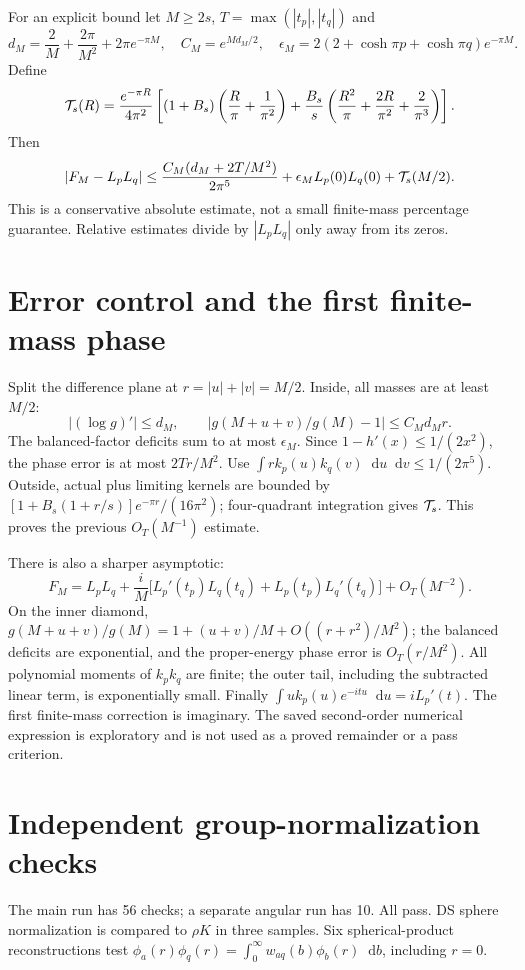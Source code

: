 \documentclass[11pt,a4paper]{article}
\newcommand{\dd}{\mathop{}\!\mathrm d}
\begin{document}
For an explicit bound let $M\ge2s$, $T=\max(|t_p|,|t_q|)$ and
\[
 d_M=\frac2M+\frac{2\pi}{M^2}+2\pi e^{-\pi M},\quad
 C_M=e^{Md_M/2},\quad
 \epsilon_M=2(2+\cosh\pi p+\cosh\pi q)e^{-\pi M}.
\]
Define
\begin{equation}
 {\cal T}_s(R)=\frac{e^{-\pi R}}{4\pi^2}
 \left[(1+B_s)\left(\frac R\pi+\frac1{\pi^2}\right)
 +\frac{B_s}{s}\left(\frac{R^2}\pi+\frac{2R}{\pi^2}+\frac2{\pi^3}\right)\right].
\end{equation}
Then
\begin{equation}
 |F_M-L_pL_q|\le
 \frac{C_M(d_M+2T/M^2)}{2\pi^5}
 +\epsilon_M L_p(0)L_q(0)+{\cal T}_s(M/2).
\end{equation}
This is a conservative absolute estimate, not a small finite-mass
percentage guarantee. Relative estimates divide by $|L_pL_q|$
only away from its zeros.

\newpage
\section{Error control and the first finite-mass phase}
Split the difference plane at $r=|u|+|v|=M/2$.
Inside, all masses are at least $M/2$:
\[
 |(\log g)'|\le d_M,\qquad
 |g(M+u+v)/g(M)-1|\le C_Md_Mr.
\]
The balanced-factor deficits sum to at most $\epsilon_M$.
Since $1-h'(x)\le1/(2x^2)$, the phase error is at most $2Tr/M^2$.
Use $\int r k_p(u)k_q(v)\dd u\dd v\le1/(2\pi^5)$.
Outside, actual plus limiting kernels are bounded by
$[1+B_s(1+r/s)]e^{-\pi r}/(16\pi^2)$; four-quadrant integration gives
$ {\cal T}_s$. This proves the previous $O_T(M^{-1})$ estimate.

There is also a sharper asymptotic:
\begin{equation}
 F_M=L_pL_q+\frac{i}{M}
  \big[L_p'(t_p)L_q(t_q)+L_p(t_p)L_q'(t_q)\big]+O_T(M^{-2}).
\end{equation}
On the inner diamond,
$g(M+u+v)/g(M)=1+(u+v)/M+O((r+r^2)/M^2)$;
the balanced deficits are exponential, and the proper-energy phase error
is $O_T(r/M^2)$. All polynomial moments of $k_pk_q$ are finite;
the outer tail, including the subtracted linear term, is exponentially small.
Finally $\int u k_p(u)e^{-itu}\dd u=iL_p'(t)$.
The first finite-mass correction is imaginary.
The saved second-order numerical expression is exploratory and
is not used as a proved remainder or a pass criterion.

\section{Independent group-normalization checks}
The main run has 56 checks; a separate angular run has 10. All pass.
DS sphere normalization is compared to $\rho K$ in three samples.
Six spherical-product reconstructions test
$\phi_a(r)\phi_q(r)=\int_0^\infty w_{aq}(b)\phi_b(r)\dd b$, including $r=0$.
\end{document}
